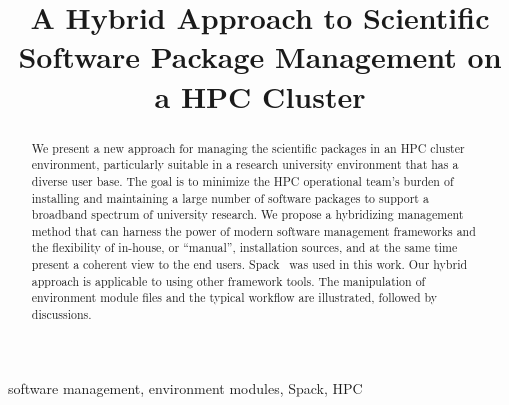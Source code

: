 \documentclass[conference]{IEEEtran}
\begin{document}
\title{A Hybrid Approach to Scientific Software Package Management on a HPC Cluster}

\author{
\and
{}
}

\maketitle

\begin{abstract}
We present a new approach for managing the scientific packages in an HPC cluster environment, particularly suitable in a research university environment that has a diverse user base.
The goal is to minimize the HPC operational team's burden of installing and maintaining a large number of software packages to support a broadband spectrum of university research.
We propose a hybridizing management method that can harness the power of modern software management frameworks and the flexibility of in-house, or ``manual'', installation sources, and at the same time present a coherent view to the end users. Spack~\cite{gamblin:15} was used in this work. Our hybrid approach is applicable to using other framework tools. The manipulation of environment module files and the typical workflow are illustrated, followed by discussions.
\end{abstract}

\begin{IEEEkeywords}
software management, environment modules, Spack, HPC 
\end{IEEEkeywords}
\end{document}
